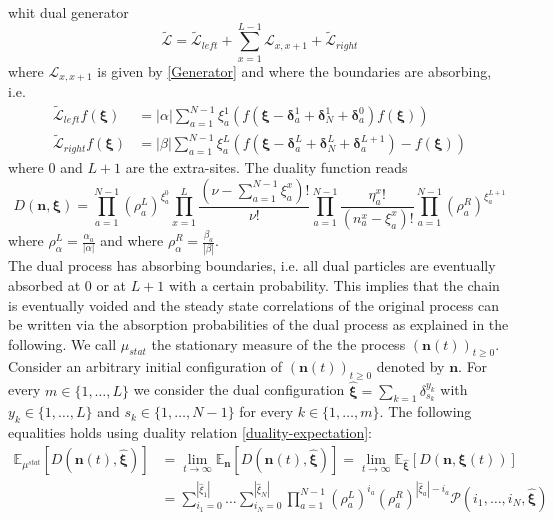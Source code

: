 \documentclass[10pt]{article}
\numberwithin{equation}{section}
\numberwithin{equation}{subsection}
\begin{document}
whit dual generator
\begin{equation}
	\widetilde{\mathcal{L}}=\widetilde{\mathcal{L}}_{left}+\sum_{x=1}^{L-1}\mathcal{L}_{x,x+1}+\widetilde{\mathcal{L}}_{right}
\end{equation} 
where $\mathcal{L}_{x,x+1}$ is given by \eqref{Generator} and where the boundaries are absorbing, i.e. 
\begin{equation}\label{abs-dual-boundary-chain}
	\begin{split}
		\widetilde{\mathcal{L}}_{left}f(\bm{\xi})&=|\alpha|\sum_{a=1}^{N-1}\xi_{a}^{1}\left(f(\bm{\xi}-\bm{\delta}_{a}^{1}+\bm{\delta}_{N}^{1}+\bm{\delta}_{a}^{0})f(\bm{\xi})\right)\\\widetilde{\mathcal{L}}_{right}f(\bm{\xi})&=|\beta|\sum_{a=1}^{N-1}\xi_{a}^{L}\left(f(\bm{\xi}-\bm{\delta}_{a}^{L}+\bm{\delta}_{N}^{L}+\bm{\delta}_{a}^{L+1})-f(\bm{\xi})\right)
	\end{split}
\end{equation}
where $0$ and $L+1$ are the extra-sites. The duality function reads
\begin{equation}\label{dualityFunctionChain}
	D(\bm{n},\bm{\xi})=\prod_{a=1}^{N-1}\left(\rho_{a}^{L}\right)^{\xi_{a}^{0}}\prod_{x=1}^{L}\frac{(\nu-\sum_{a=1}^{N-1}\xi_{a}^{x})!}{\nu!}\prod_{a=1}^{N-1}\frac{\eta_{a}^{x}!}{(n_{a}^{x}-\xi_{a}^{x})!}\prod_{a=1}^{N-1}\left(\rho_{a}^{R}\right)^{\xi_{a}^{L+1}}
\end{equation}
where $\rho_{\alpha}^{L}=\frac{\alpha_{a}}{|\alpha|}$ and where $\rho_{\alpha}^{R}=\frac{\beta_{a}}{|\beta|}$.\\
The dual process has absorbing boundaries, i.e. all dual particles are eventually absorbed at $0$ or at $L+1$ with a certain probability. This implies that the chain is eventually voided and the steady state correlations of the original process can be written via the absorption probabilities of the dual process as explained in the following. 
We call $\mu_{stat}$ the stationary measure of the the process $(\bm{n}(t))_{t\geq 0}$. Consider an arbitrary initial configuration of $(\bm{n}(t))_{t\geq 0}$ denoted by $\bm{n}$. For every $m\in\{1,\ldots,L\}$ we consider the dual configuration  $\bm{\widehat{\xi}}=\sum_{k=1}\delta_{s_{k}}^{y_{k}}$ with $y_{k}\in\{1,\ldots,L\}$ and $s_{k}\in \{1,\ldots,N-1\}$ for every $k\in \{1,\ldots,m\}$. The following  equalities holds using duality relation \eqref{duality-expectation}:
\begin{equation}\label{ExptationSS}
	\begin{split}
		\mathbb{E}_{\mu^{stat}}\left[D(\bm{n}(t),\hat{\bm{\xi}})\right]&=\lim_{t\to\infty}\mathbb{E}_{\bm{n}}\left[D(\bm{n}(t),\hat{\bm{\xi}})\right]=\lim_{t\to\infty}\mathbb{E}_{\hat{\bm{\xi}}}\left[D(\bm{n},\bm{\xi}(t))\right]
		\\&=
		\sum_{i_{1}=0}^{|\hat{\xi}_{1}|}\ldots\sum_{i_{N}=0}^{|\hat{\xi}_{N}|}\prod_{a=1}^{N-1}\left(\rho_{a}^{L}\right)^{i_{a}}\left(\rho_{a}^{R}\right)^{|\hat{\xi}_{a}|-i_{a}}\mathcal{P}(i_{1},\ldots,i_{N},\hat{\bm{\xi}})
	\end{split}
\end{equation}
\end{document}

